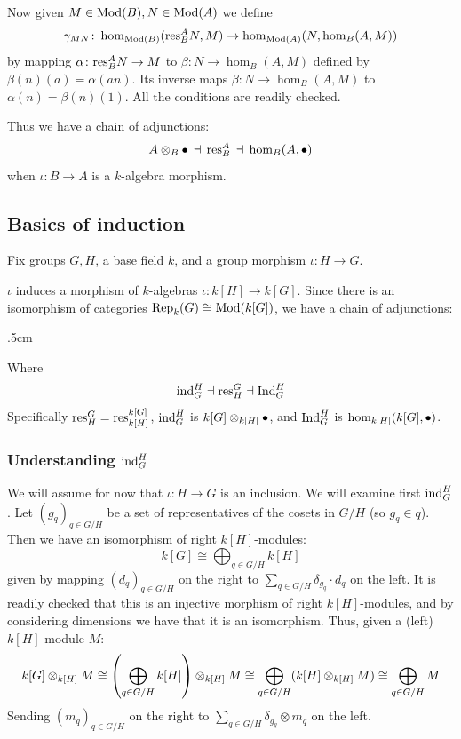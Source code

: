 Now given $M\in{\rm Mod}(B),N\in{\rm Mod}(A)$ we define
$$ \gamma_{MN}\colon \hom_{{\rm Mod}(B)}({\rm res}^A_BN,M) \to \hom_{{\rm Mod}(A)}(N,\hom_B(A,M)) $$
by mapping $\alpha\colon{\rm res}^A_BN\to M$ to $\beta\colon N\to\hom_B(A,M)$ defined by $\beta(n)(a)=\alpha(an)$.
Its inverse maps $\beta\colon N\to\hom_B(A,M)$ to $\alpha(n)=\beta(n)(1)$.
All the conditions are readily checked.

Thus we have a chain of adjunctions:
$$ A\otimes_B\bullet\,\dashv\,{\rm res}^A_B\,\dashv\,\hom_B(A,\bullet) $$
when $\iota\colon B\to A$ is a $k$-algebra morphism.

\subsection{Basics of induction}

Fix groups $G,H$, a base field $k$, and a group morphism $\iota\colon H\to G$.

$\iota$ induces a morphism of $k$-algebras $\iota\colon k[H]\to k[G]$.
Since there is an isomorphism of categories ${\rm Rep}_k(G)\cong{\rm Mod}(k[G])$, we have a chain of adjunctions:

\kern1cm
\centerline{}
\kern.5cm

Where
$$ {\rm ind}^H_G\dashv{\rm res}^G_H\dashv{\rm Ind}^H_G $$
Specifically ${\rm res}^G_H={\rm res}^{k[G]}_{k[H]}$, ${\rm ind}^H_G$ is $k[G]\otimes_{k[H]}\bullet$, and ${\rm Ind}^H_G$ is $\hom_{k[H]}(k[G],\bullet)$.

\subsubsection*{Understanding ${\rm ind}^H_G$}

We will assume for now that $\iota\colon H\to G$ is an inclusion.
We will examine first ${\rm ind}^H_G$.
Let $(g_q)_{q\in G/H}$ be a set of representatives of the cosets in $G/H$ (so $g_q\in q$).
Then we have an isomorphism of right $k[H]$-modules:
$$ k[G]\cong\bigoplus_{q\in G/H}k[H] $$
given by mapping $(d_q)_{q\in G/H}$ on the right to $\sum_{q\in G/H}\delta_{g_q}\cdot d_q$ on the left.
It is readily checked that this is an injective morphism of right $k[H]$-modules, and by considering dimensions we have that it is an isomorphism.
Thus, given a (left) $k[H]$-module $M$:
$$ k[G]\otimes_{k[H]}M \cong \mathopen{}\mathclose{\left(\bigoplus_{q\in G/H}k[H]\right)}\otimes_{k[H]}M \cong \bigoplus_{q\in G/H}(k[H]\otimes_{k[H]}M) \cong \bigoplus_{q\in G/H}M $$
Sending $(m_q)_{q\in G/H}$ on the right to $\sum_{q\in G/H}\delta_{g_q}\otimes m_q$ on the left.


